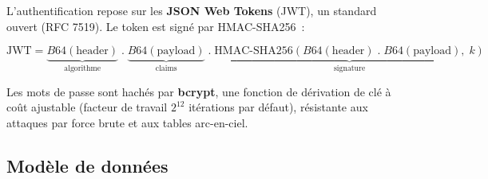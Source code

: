 \documentclass[12pt, a4paper]{article}
\begin{document}
L'authentification repose sur les \textbf{JSON Web Tokens} (JWT), un standard ouvert (RFC 7519). Le token est signé par HMAC-SHA256~:

\begin{mathbox}[title=Structure du JWT]
\[
\mathrm{JWT} = \underbrace{B64(\text{header})}_{\text{algorithme}} \;.\; \underbrace{B64(\text{payload})}_{\text{claims}} \;.\; \underbrace{\mathrm{HMAC\text{-}SHA256}(B64(\text{header}) \;.\; B64(\text{payload}),\; k)}_{\text{signature}}
\]
\end{mathbox}

Les mots de passe sont hachés par \textbf{bcrypt}, une fonction de dérivation de clé à coût ajustable (facteur de travail $2^{12}$ itérations par défaut), résistante aux attaques par force brute et aux tables arc-en-ciel.

\subsection{Modèle de données}
\end{document}
